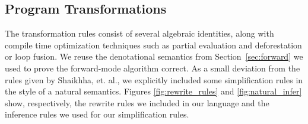 \subsection{Program Transformations}
The transformation rules consist of several algebraic identities, along with compile time optimization techniques such as partial evaluation and deforestation or loop fusion.
We reuse the denotational semantics from Section~\ref{sec:forward} we used to prove the forward-mode algorithm correct.
As a small deviation from the rules given by Shaikhha, et. al.\cite{Shaikha2019}, we explicitly included some simplification rules in the style of a natural semantics. Figures \ref{fig:rewrite_rules} and \ref{fig:natural_infer} show, respectively, the rewrite rules we included in our language and the inference rules we used for our simplification rules.

